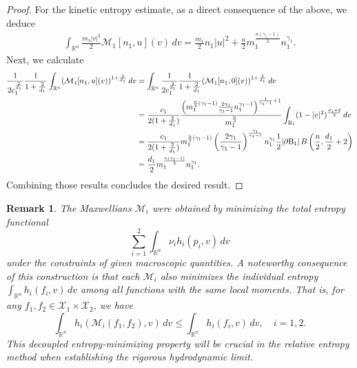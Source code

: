 \documentclass[10pt,reqno]{amsart}
\numberwithin{equation}{section}
\newtheorem{remark}{Remark}[section]
\newcommand{\R}{\mathbb R}
\newcommand{\lt}{\left}
\newcommand{\rt}{\right}
\newcommand{\intr}{\int_{\R^n}}
\newcommand{\calX}{\mathcal X}
\newcommand{\calM}{\mathcal M}
\begin{document}
\begin{proof}
 For the kinetic entropy estimate, as a direct consequence of the above, we deduce
 \begin{align*}
        \int_{\R^n} \frac{m_1|v|^2}{2}\calM_1[n_1, u](v)\,dv = \frac{m_1}{2}n_1|u|^2 + \frac{n}{2}m_1^{\frac{n(\gamma_1-1)}{2}} n_1^{\gamma_1} .
    \end{align*}
    Next, we calculate
    \begin{align*}
        \frac{1}{2c_1^{\frac{2}{d_1}}} \frac{1}{1+\frac{2}{d_1}} \int_{\R^n}  (\calM_1[n_1, u](v))^{1+\frac{2}{d_1}} \,dv 
                & = \int_{\R^n} \frac{1}{2c_1^{\frac{2}{d_1}}} \frac{1}{1+\frac{2}{d_1}} (\calM_1[n_1, 0](v))^{1+\frac{2}{d_1}} \,dv \\
                & = \frac{c_1}{2(1 + \frac2{d_1})} \frac{\lt(m_1^{\frac{n}{2}(\gamma_1 - 1)} \frac{2\gamma_1}{\gamma_1-1}n_1^{\gamma_1 - 1}\rt)^{\frac1{\gamma_1 - 1} + 1}}{m_1^{\frac n2}} \int_{{\rm B}_1} (1 - |v|^2)^{\frac{d_1+2}{2}}\,dv\cr
                &  = \frac{c_1}{2(1 + \frac2{d_1})} m_1^{\frac{n}{2}(\gamma_1 - 1)}\lt(\frac{2\gamma_1}{\gamma_1 - 1}\rt)^{\frac{\gamma_1}{\gamma_1-1}} n_1^{\gamma_1} \frac{1}{2} |\partial \mathrm{B}_1| \, B\left(\frac{n}{2}, \frac{d_1}{2} + 2\right)\cr
        &  = \frac{d_1}{2} m_1^{\frac{n(\gamma_1-1)}{2}} n_1^{\gamma_1}.
    \end{align*}
Combining those results concludes the desired result.
\end{proof}

 
\begin{remark}\label{rem: each h} 
The Maxwellians $\calM_i$ were obtained by minimizing the total entropy functional
\[
\sum_{i=1}^2 \intr  \nu_i  h_i(p_i, v)\,dv
\]
under the constraints of given macroscopic quantities. A noteworthy consequence of this construction is that each $\calM_i$ also minimizes the individual entropy $\intr h_i(f_i,v)\,dv$ among all functions with the same local moments. That is, for any  $f_1, f_2 \in \calX_1 \times \calX_2$, we have
\[
\intr h_i(\calM_i(f_1, f_2), v)\,dv \leq \intr h_i(f_i, v)\,dv, \quad i=1,2.
\]
This decoupled entropy-minimizing property will be crucial in the relative entropy method when establishing the rigorous hydrodynamic limit. 
\end{remark}



%
%
%                         
%
%
%
%
%                         
%
%
\end{document}
